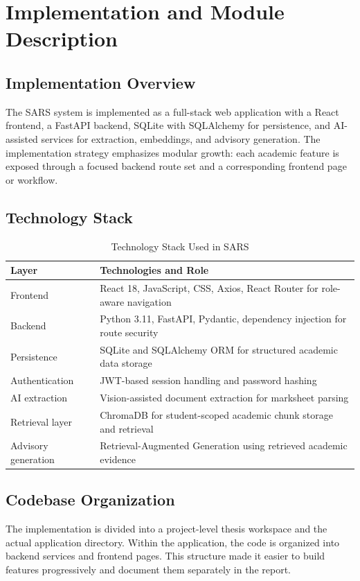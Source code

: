 \chapter{Implementation and Module Description}

\section{Implementation Overview}
The SARS system is implemented as a full-stack web application with a React frontend, a FastAPI backend, SQLite with SQLAlchemy for persistence, and AI-assisted services for extraction, embeddings, and advisory generation. The implementation strategy emphasizes modular growth: each academic feature is exposed through a focused backend route set and a corresponding frontend page or workflow.

\section{Technology Stack}
\begin{table}[H]
\centering
\caption{Technology Stack Used in SARS}
\begin{tabularx}{\textwidth}{>{\raggedright\arraybackslash}p{} >{\raggedright\arraybackslash}X}
\toprule
\textbf{Layer} & \textbf{Technologies and Role} \\
\midrule
Frontend & React 18, JavaScript, CSS, Axios, React Router for role-aware navigation \\
Backend & Python 3.11, FastAPI, Pydantic, dependency injection for route security \\
Persistence & SQLite and SQLAlchemy ORM for structured academic data storage \\
Authentication & JWT-based session handling and password hashing \\
AI extraction & Vision-assisted document extraction for marksheet parsing \\
Retrieval layer & ChromaDB for student-scoped academic chunk storage and retrieval \\
Advisory generation & Retrieval-Augmented Generation using retrieved academic evidence \\
\bottomrule
\end{tabularx}
\end{table}

\section{Codebase Organization}
The implementation is divided into a project-level thesis workspace and the actual application directory. Within the application, the code is organized into backend services and frontend pages. This structure made it easier to build features progressively and document them separately in the report.

